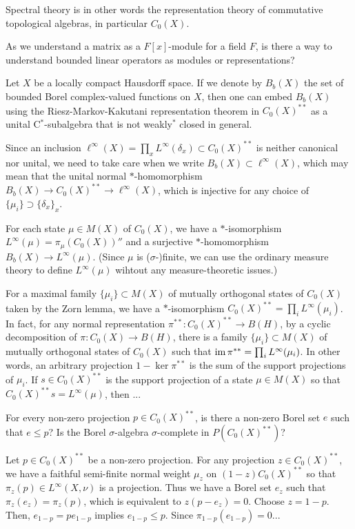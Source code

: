 \documentclass{../../large}
\begin{document}
Spectral theory is in other words the representation theory of commutative topological algebras, in particular $C_0(X)$.

As we understand a matrix as a $F[x]$-module for a field $F$, is there a way to understand bounded linear operators as modules or representations?


\begin{prb}
Let $X$ be a locally compact Hausdorff space.
If we denote by $B_b(X)$ the set of bounded Borel complex-valued functions on $X$, then one can embed $B_b(X)$ using the Riesz-Markov-Kakutani representation theorem in $C_0(X)^{**}$ as a unital C$^*$-subalgebra that is not weakly$^*$ closed in general.

Since an inclusion $\ell^\infty(X)=\prod_x L^\infty(\delta_x)\subset C_0(X)^{**}$ is neither canonical nor unital, we need to take care when we write $B_b(X)\subset\ell^\infty(X)$, which may mean that the unital normal $*$-homomorphism $B_b(X)\to C_0(X)^{**}\to\ell^\infty(X)$, which is injective for any choice of $\{\mu_i\}\supset\{\delta_x\}_x$.

\begin{parts}
\item For each state $\mu\in M(X)$ of $C_0(X)$, we have a $*$-isomorphism $L^\infty(\mu)=\pi_\mu(C_0(X))''$ and a surjective $*$-homomorphism $B_b(X)\to L^\infty(\mu)$.
(Since $\mu$ is ($\sigma$-)finite, we can use the ordinary measure theory to define $L^\infty(\mu)$ wihtout any measure-theoretic issues.)
\item For a maximal family $\{\mu_i\}\subset M(X)$ of mutually orthogonal states of $C_0(X)$ taken by the Zorn lemma, we have a $*$-isomorphism $C_0(X)^{**}=\prod_iL^\infty(\mu_i)$.
In fact, for any normal representation $\pi^{**}:C_0(X)^{**}\to B(H)$, by a cyclic decomposition of $\pi:C_0(X)\to B(H)$, there is a family $\{\mu_i\}\subset M(X)$ of mutually orthogonal states of $C_0(X)$ such that $\operatorname{im}\pi^{**}=\prod_iL^\infty(\mu_i)$.
In other words, an arbitrary projection $1-\ker\pi^{**}$ is the sum of the support projections of $\mu_i$.
If $s\in C_0(X)^{**}$ is the support projection of a state $\mu\in M(X)$ so that $C_0(X)^{**}s=L^\infty(\mu)$, then ...


For every non-zero projection $p\in C_0(X)^{**}$, is there a non-zero Borel set $e$ such that $e\le p$?
Is the Borel $\sigma$-algebra $\sigma$-complete in $P(C_0(X)^{**})$?

Let $p\in C_0(X)^{**}$ be a non-zero projection.
For any projection $z\in C_0(X)^{**}$, we have a faithful semi-finite normal weight $\mu_z$ on $(1-z)C_0(X)^{**}$ so that $\pi_z(p)\in L^\infty(X,\nu)$ is a projection.
Thus we have a Borel set $e_z$ such that $\pi_z(e_z)=\pi_z(p)$, which is equivalent to $z(p-e_z)=0$.
Choose $z=1-p$.
Then, $e_{1-p}=pe_{1-p}$ implies $e_{1-p}\le p$.
Since $\pi_{1-p}(e_{1-p})=0...$


\end{parts}
\end{prb}
\end{document}
